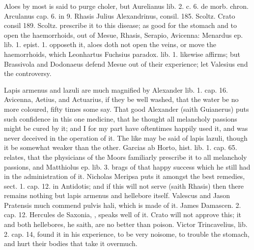 {Aloes by most is said to purge choler, but Aurelianus lib. 2. c. 6. de
morb. chron. Arculanus cap. 6. in 9. Rhasis Julius Alexandrinus,
consil. 185. Scoltz. Crato consil 189. Scoltz. prescribe it to this
disease; as good for the stomach and to open the haemorrhoids, out of
Mesue, Rhasis, Serapio, Avicenna: Menardus ep. lib. 1. epist. 1.
opposeth it, aloes doth not open the veins, or move the
haemorrhoids, which Leonhartus Fuchsius paradox. lib. 1. likewise
affirms; but Brassivola and Dodonaeus defend Mesue out of their
experience; let Valesius end the controversy.

Lapis armenus and lazuli are much magnified by Alexander lib. 1.
cap. 16. Avicenna, Aetius, and Actuarius, if they be well washed, that
the water be no more coloured, fifty times some say. That good
Alexander (saith Guianerus) puts such confidence in this one medicine,
that he thought all melancholy passions might be cured by it; and I for
my part have oftentimes happily used it, and was never deceived in the
operation of it. The like may be said of lapis lazuli, though it be
somewhat weaker than the other. Garcias ab Horto, hist. lib. 1. cap.
65. relates, that the physicians of the Moors familiarly
prescribe it to all melancholy passions, and Matthiolus ep. lib. 3.
brags of that happy success which he still had in the
administration of it. Nicholas Meripsa puts it amongst the best
remedies, sect. 1. cap. 12. in Antidotis; and if this will not
serve (saith Rhasis) then there remains nothing but lapis armenus and
hellebore itself. Valescus and Jason Pratensis much commend pulvis
hali, which is made of it. James Damascen. 2. cap. 12. Hercules de
Saxonia, \etc{}, speaks well of it. Crato will not approve this; it and
both hellebores, he saith, are no better than poison. Victor
Trincavelius, lib. 2. cap. 14, found it in his experience, to be
very noisome, to trouble the stomach, and hurt their bodies that take
it overmuch.
\clearpage{}

}
